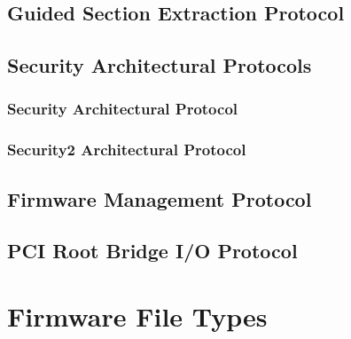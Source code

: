 \subsection{Guided Section Extraction Protocol}

\clearpage

\subsection{Security Architectural Protocols}
\label{sec:appendix:protocols:security:architectual:protocols}

\subsubsection{Security Architectural Protocol}


\subsubsection{Security2 Architectural Protocol}

\clearpage

\subsection{Firmware Management Protocol}

\clearpage

\subsection{\acs{PCI} Root Bridge \acs{I/O} Protocol}

\clearpage

\section{Firmware File Types}

